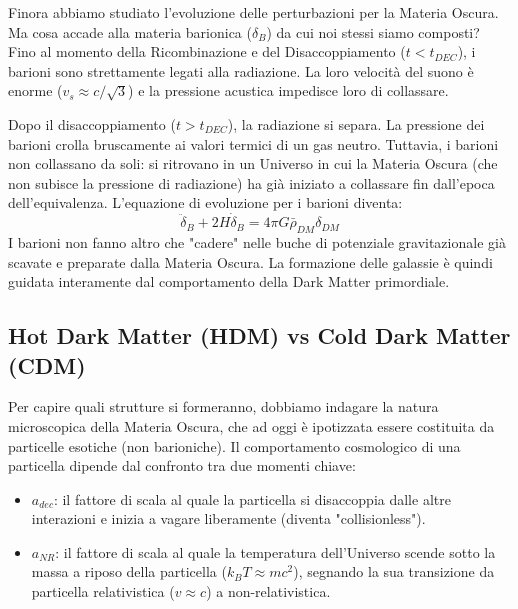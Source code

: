 \documentclass[11pt,a4paper]{report}
\begin{document}
Finora abbiamo studiato l'evoluzione delle perturbazioni per la Materia Oscura. Ma cosa accade alla materia barionica ($\delta_B$) da cui noi stessi siamo composti?
Fino al momento della Ricombinazione e del Disaccoppiamento ($t < t_{DEC}$), i barioni sono strettamente legati alla radiazione. La loro velocità del suono è enorme ($v_s \approx c/\sqrt{3}$) e la pressione acustica impedisce loro di collassare.

Dopo il disaccoppiamento ($t > t_{DEC}$), la radiazione si separa. La pressione dei barioni crolla bruscamente ai valori termici di un gas neutro. Tuttavia, i barioni non collassano da soli: si ritrovano in un Universo in cui la Materia Oscura (che non subisce la pressione di radiazione) ha già iniziato a collassare fin dall'epoca dell'equivalenza. L'equazione di evoluzione per i barioni diventa:
\begin{equation}
\ddot{\delta}_B + 2H\dot{\delta}_B = 4\pi G \bar{\rho}_{DM} \delta_{DM}
\end{equation}
I barioni non fanno altro che "cadere" nelle buche di potenziale gravitazionale già scavate e preparate dalla Materia Oscura. La formazione delle galassie è quindi guidata interamente dal comportamento della Dark Matter primordiale.

\subsection{Hot Dark Matter (HDM) vs Cold Dark Matter (CDM)}
Per capire quali strutture si formeranno, dobbiamo indagare la natura microscopica della Materia Oscura, che ad oggi è ipotizzata essere costituita da particelle esotiche (non barioniche). Il comportamento cosmologico di una particella dipende dal confronto tra due momenti chiave:
\begin{itemize}
    \item $a_{dec}$: il fattore di scala al quale la particella si disaccoppia dalle altre interazioni e inizia a vagare liberamente (diventa "collisionless").
    \item $a_{NR}$: il fattore di scala al quale la temperatura dell'Universo scende sotto la massa a riposo della particella ($k_B T \approx mc^2$), segnando la sua transizione da particella relativistica ($v \approx c$) a non-relativistica.
\end{itemize}
\end{document}
